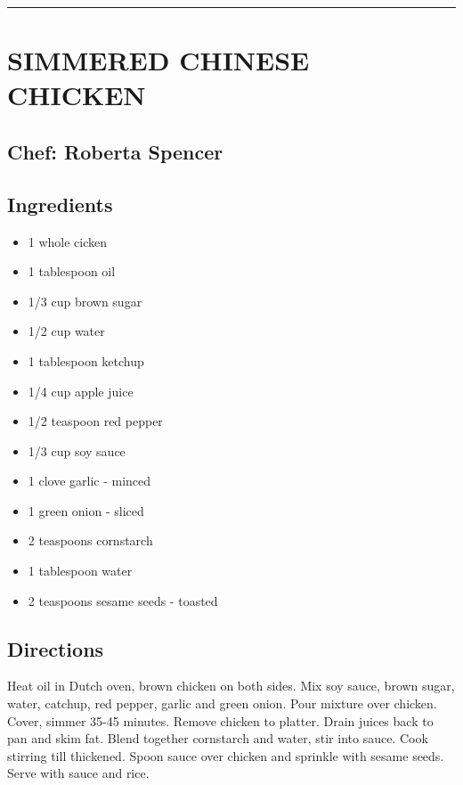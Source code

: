 \documentclass[
]{book}
\providecommand{\tightlist}{%
  \setlength{\itemsep}{0pt}\setlength{\parskip}{0pt}}
\begin{document}
\begin{center}\rule{0.5\linewidth}{0.5pt}\end{center}

\hypertarget{simmered-chinese-chicken}{%
\section*{SIMMERED CHINESE CHICKEN}\label{simmered-chinese-chicken}}


\hypertarget{chef-roberta-spencer-22}{%
\subsection*{Chef: Roberta Spencer}\label{chef-roberta-spencer-22}}


\hypertarget{ingredients-65}{%
\subsection*{Ingredients}\label{ingredients-65}}


\begin{itemize}
\tightlist
\item
  1 whole cicken
\item
  1 tablespoon oil
\item
  1/3 cup brown sugar
\item
  1/2 cup water
\item
  1 tablespoon ketchup
\item
  1/4 cup apple juice
\item
  1/2 teaspoon red pepper
\item
  1/3 cup soy sauce
\item
  1 clove garlic - minced
\item
  1 green onion - sliced
\item
  2 teaspoons cornstarch
\item
  1 tablespoon water
\item
  2 teaspoons sesame seeds - toasted
\end{itemize}

\hypertarget{directions-65}{%
\subsection*{Directions}\label{directions-65}}


Heat oil in Dutch oven, brown chicken on both sides. Mix soy sauce, brown sugar, water, catchup,
red pepper, garlic and green onion. Pour mixture over chicken. Cover, simmer 35-45 minutes.
Remove chicken to platter. Drain juices back to pan and skim fat. Blend together cornstarch and water,
stir into sauce. Cook stirring till thickened. Spoon sauce over chicken and sprinkle with sesame seeds.
Serve with sauce and rice.
\end{document}
